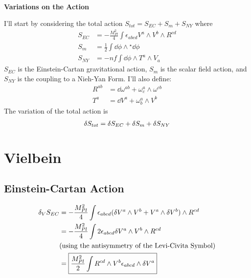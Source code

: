 \documentclass[12pt]{article}
\newcommand{\hodge}{{^\star}}
\begin{document}
\begin{center}
  \Large\textbf{Variations on the Action} \\
  \large{}
\end{center}

I'll start by considering the total action $S_{tot} = S_{EC} + S_m + S_{NY}$ where
\begin{align}
  S_{EC} &= -\frac{M_{Pl}^2}{4}\int\epsilon_{abcd}V^a \wedge V^b \wedge R^{cd} \\
  S_m &= \frac{1}{2}\int\dd\phi\wedge\hodge\dd\phi \\
  S_{NY} &= -\mathit{nf}\int\dd\phi\wedge T^a \wedge V_a
\end{align}
$S_{EC}$ is the Einstein-Cartan gravitational action, $S_m$ is the scalar field action, and $S_{NY}$ is the coupling to a Nieh-Yan Form. I'll also define:
\begin{align*}
  R^{ab} &= \dd\omega^{ab} + \omega^a_c \wedge \omega^{cb} \\
  T^a &= \dd V^a + \omega^a_b \wedge V^b
\end{align*}
The variation of the total action is
\begin{align}
  \var{S_{tot}} = \var{S_{EC}} + \var{S_m} + \var{S_{NY}}
\end{align}

\section{Vielbein}
\subsection{Einstein-Cartan Action}
\begin{align}
  \var_V{S_{EC}} &= -\frac{M_{Pl}^2}{4}\int \epsilon_{abcd}(\var V^a \wedge V^b + V^a \wedge \var V^b) \wedge R^{cd} \nonumber \\
  &= -\frac{M_{Pl}^2}{4}\int 2\epsilon_{abcd}\var V^a \wedge V^b \wedge R^{cd} \nonumber \\ &\text{(using the antisymmetry of the Levi-Civita Symbol)} \nonumber\\
  &= \boxed{\frac{M_{Pl}^2}{2}\int R^{cd} \wedge V^b \epsilon_{abcd} \wedge \var V^a}
\end{align}
\end{document}
